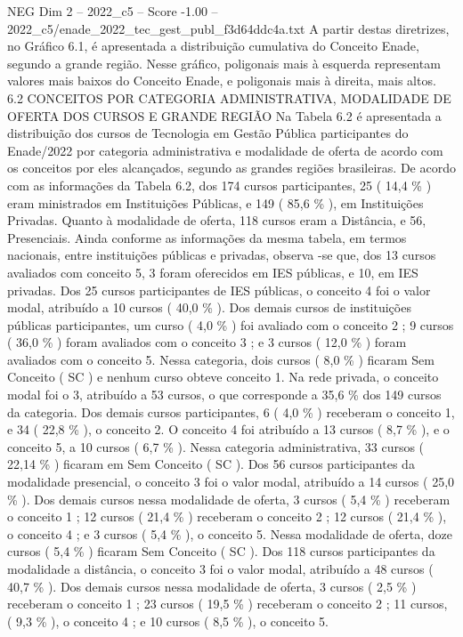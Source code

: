 \begin{textsample}{NEG Dim 2 – 2022\_c5 – Score -1.00 – 2022\_c5/enade\_2022\_tec\_gest\_publ\_f3d64ddc4a.txt}
A partir destas diretrizes, no Gráfico 6.1, é apresentada a distribuição cumulativa do Conceito Enade, segundo a grande região.
Nesse gráfico, poligonais mais à esquerda representam valores mais baixos do Conceito Enade, e poligonais mais à direita, mais altos. 6.2 CONCEITOS POR CATEGORIA ADMINISTRATIVA, MODALIDADE DE OFERTA DOS CURSOS E GRANDE REGIÃO Na Tabela 6.2 é apresentada a distribuição dos cursos de Tecnologia em Gestão Pública participantes do Enade/2022 por categoria administrativa e modalidade de oferta de acordo com os conceitos por eles alcançados, segundo as grandes regiões brasileiras.
De acordo com as informações da Tabela 6.2, dos 174 cursos participantes, 25 ( 14,4 \% ) eram ministrados em Instituições Públicas, e 149 ( 85,6 \% ), em Instituições Privadas.
Quanto à modalidade de oferta, 118 cursos eram a Distância, e 56, Presenciais.
Ainda conforme as informações da mesma tabela, em termos nacionais, entre instituições públicas e privadas, observa -se que, dos 13 cursos avaliados com conceito 5, 3 foram oferecidos em IES públicas, e 10, em IES privadas.
Dos 25 cursos participantes de IES públicas, o conceito 4 foi o valor modal, atribuído a 10 cursos ( 40,0 \% ).
Dos demais cursos de instituições públicas participantes, um curso ( 4,0 \% ) foi avaliado com o conceito 2 ; 9 cursos ( 36,0 \% ) foram avaliados com o conceito 3 ; e 3 cursos ( 12,0 \% ) foram avaliados com o conceito 5.
Nessa categoria, dois cursos ( 8,0 \% ) ficaram Sem Conceito ( SC ) e nenhum curso obteve conceito 1.
Na rede privada, o conceito modal foi o 3, atribuído a 53 cursos, o que corresponde a 35,6 \% dos 149 cursos da categoria.
Dos demais cursos participantes, 6 ( 4,0 \% ) receberam o conceito 1, e 34 ( 22,8 \% ), o conceito 2.
O conceito 4 foi atribuído a 13 cursos ( 8,7 \% ), e o conceito 5, a 10 cursos ( 6,7 \% ).
Nessa categoria administrativa, 33 cursos ( 22,14 \% ) ficaram em Sem Conceito ( SC ).
Dos 56 cursos participantes da modalidade presencial, o conceito 3 foi o valor modal, atribuído a 14 cursos ( 25,0 \% ).
Dos demais cursos nessa modalidade de oferta, 3 cursos ( 5,4 \% ) receberam o conceito 1 ; 12 cursos ( 21,4 \% ) receberam o conceito 2 ; 12 cursos ( 21,4 \% ), o conceito 4 ; e 3 cursos ( 5,4 \% ), o conceito 5.
Nessa modalidade de oferta, doze cursos ( 5,4 \% ) ficaram Sem Conceito ( SC ).
Dos 118 cursos participantes da modalidade a distância, o conceito 3 foi o valor modal, atribuído a 48 cursos ( 40,7 \% ).
Dos demais cursos nessa modalidade de oferta, 3 cursos ( 2,5 \% ) receberam o conceito 1 ; 23 cursos ( 19,5 \% ) receberam o conceito 2 ; 11 cursos, ( 9,3 \% ), o conceito 4 ; e 10 cursos ( 8,5 \% ), o conceito 5.

\end{textsample}
